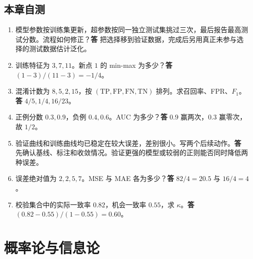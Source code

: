 \documentclass[UTF8,a4paper,zihao=-4,fontset=fandol]{ctexrep}
\begin{document}
\section{本章自测}
\begin{enumerate}[leftmargin=2em]
\item 模型参数按训练集更新，超参数按同一独立测试集挑过三次，最后报告最高测试分数。流程如何修正？\textbf{答} 把选择移到验证数据，完成后另用真正未参与选择的测试数据估计泛化。
\item 训练特征为 \(3,7,11\)。新点 \(1\) 的 min-max 为多少？\textbf{答} \((1-3)/(11-3)=-1/4\)。
\item 混淆计数为 \(8,5,2,15\)，按 \((\mathrm{TP},\mathrm{FP},\mathrm{FN},\mathrm{TN})\) 排列。求召回率、FPR、\(F_1\)。\textbf{答} \(4/5,1/4,16/23\)。
\item 正例分数 \(0.3,0.9\)，负例 \(0.4,0.6\)。AUC 为多少？\textbf{答} \(0.9\) 赢两次，\(0.3\) 赢零次，故 \(1/2\)。
\item 验证曲线和训练曲线均已稳定在较大误差，差别很小。写两个后续动作。\textbf{答} 先确认基线、标注和收敛情况。验证更强的模型或较弱的正则能否同时降低两种误差。
\item 误差绝对值为 \(2,2,5,7\)。MSE 与 MAE 各为多少？\textbf{答} \(82/4=20.5\) 与 \(16/4=4\)。
\item 校验集合中的实际一致率 \(0.82\)，机会一致率 \(0.55\)，求 \(\kappa\)。\textbf{答} \((0.82-0.55)/(1-0.55)=0.60\)。
\end{enumerate}

\chapter{概率论与信息论}
\end{document}
